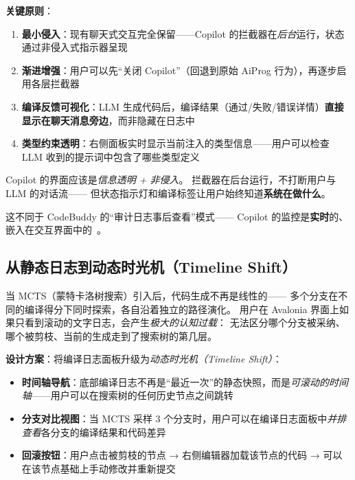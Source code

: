 \documentclass[10pt, openany]{book}
\begin{document}
\textbf{关键原则}：
\begin{enumerate}
    \item \textbf{最小侵入}：现有聊天式交互完全保留——Copilot 的拦截器在\emph{后台}运行，状态通过非侵入式指示器呈现
    \item \textbf{渐进增强}：用户可以先``关闭 Copilot''（回退到原始 AiProg 行为），再逐步启用各层拦截器
    \item \textbf{编译反馈可视化}：LLM 生成代码后，编译结果（通过/失败/错误详情）\textbf{直接显示在聊天消息旁边}，而非隐藏在日志中
    \item \textbf{类型约束透明}：右侧面板实时显示当前注入的类型信息——用户可以检查 LLM 收到的提示词中包含了哪些类型定义
\end{enumerate}

\begin{principle}[界面设计原则]
Copilot 的界面应该是\emph{信息透明 + 非侵入}。
拦截器在后台运行，不打断用户与 LLM 的对话流——
但状态指示灯和编译标签让用户始终知道\textbf{系统在做什么}。

这不同于 CodeBuddy 的``审计日志事后查看''模式——
Copilot 的监控是\textbf{实时}的、嵌入在交互界面中的~\cite{Wu2024AutoGen}。
\end{principle}

\subsection{从静态日志到动态时光机（Timeline Shift）}

当 MCTS（蒙特卡洛树搜索）引入后，代码生成不再是线性的——
多个分支在不同的编译得分下同时探索，各自沿着独立的路径演化。
用户在 Avalonia 界面上如果只看到滚动的文字日志，会产生\emph{极大的认知过载}：
无法区分哪个分支被采纳、哪个被剪枝、当前的生成走到了搜索树的第几层。

\textbf{设计方案}：将编译日志面板升级为\emph{动态时光机（Timeline Shift）}：

\begin{itemize}
    \item \textbf{时间轴导航}：底部编译日志不再是``最近一次''的静态快照，而是\emph{可滚动的时间轴}——用户可以在搜索树的任何历史节点之间跳转
    \item \textbf{分支对比视图}：当 MCTS 采样 3 个分支时，用户可以在编译日志面板中\emph{并排查看}各分支的编译结果和代码差异
    \item \textbf{回滚按钮}：用户点击被剪枝的节点 → 右侧编辑器加载该节点的代码 → 可以在该节点基础上手动修改并重新提交
\end{itemize}
\end{document}
